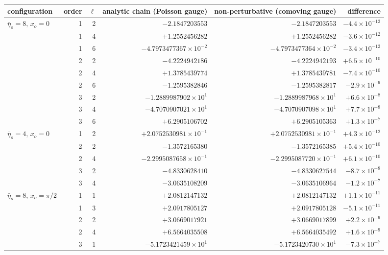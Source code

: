 \begin{table}[t]
\centering\small
\setlength{\tabcolsep}{3pt}\begin{tabular}{@{}lrr rrr@{}}
\hline
configuration & order & $\ell$ & analytic chain (Poisson gauge) & non-perturbative (comoving gauge) & difference\\ \hline
$\bar\eta_o=8$, $x_o=0$ & 1 & 2 & $-2.1847203553$ & $-2.1847203553$ & $-4.4\times10^{-12}$\\
 & 1 & 4 & $+1.2552456282$ & $+1.2552456282$ & $-3.6\times10^{-12}$\\
 & 1 & 6 & $-4.7973477367\times10^{-2}$ & $-4.7973477364\times10^{-2}$ & $-3.4\times10^{-12}$\\
 & 2 & 2 & $-4.2224942186$ & $-4.2224942193$ & $+6.5\times10^{-10}$\\
 & 2 & 4 & $+1.3785439774$ & $+1.3785439781$ & $-7.4\times10^{-10}$\\
 & 2 & 6 & $-1.2595382846$ & $-1.2595382817$ & $-2.9\times10^{-9}$\\
 & 3 & 2 & $-1.2889987902\times10^{1}$ & $-1.2889987968\times10^{1}$ & $+6.6\times10^{-8}$\\
 & 3 & 4 & $-4.7070907021\times10^{1}$ & $-4.7070907098\times10^{1}$ & $+7.7\times10^{-8}$\\
 & 3 & 6 & $+6.2905106702$ & $+6.2905105363$ & $+1.3\times10^{-7}$\\ \hline
$\bar\eta_o=4$, $x_o=0$ & 1 & 2 & $+2.0752530981\times10^{-1}$ & $+2.0752530981\times10^{-1}$ & $+4.3\times10^{-12}$\\
 & 2 & 2 & $-1.3572165380$ & $-1.3572165385$ & $+5.4\times10^{-10}$\\
 & 2 & 4 & $-2.2995087658\times10^{-1}$ & $-2.2995087720\times10^{-1}$ & $+6.1\times10^{-10}$\\
 & 3 & 2 & $-4.8330628410$ & $-4.8330627544$ & $-8.7\times10^{-8}$\\
 & 3 & 4 & $-3.0635108209$ & $-3.0635106964$ & $-1.2\times10^{-7}$\\ \hline
$\bar\eta_o=8$, $x_o=\pi/2$ & 1 & 1 & $+2.0812147132$ & $+2.0812147132$ & $+1.1\times10^{-11}$\\
 & 1 & 3 & $+2.0917805127$ & $+2.0917805128$ & $-5.1\times10^{-11}$\\
 & 2 & 2 & $+3.0669017921$ & $+3.0669017899$ & $+2.2\times10^{-9}$\\
 & 2 & 4 & $+6.5664035508$ & $+6.5664035492$ & $+1.6\times10^{-9}$\\
 & 3 & 1 & $-5.1723421459\times10^{1}$ & $-5.1723420730\times10^{1}$ & $-7.3\times10^{-7}$\\

\end{tabular}
\end{table}
